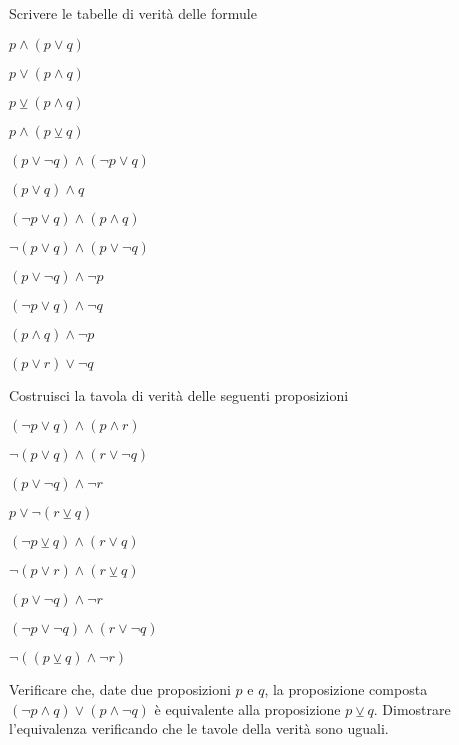 \begin{esercizio}
\label{ese:0.8}
Scrivere le tabelle di verità delle formule 
\begin{multicols}{3}
\begin{enumeratea}
\item $p\wedge(p\vee q)$
\item $p\vee(p\wedge q)$
\item $p\veebar(p\wedge q)$
\item $p\wedge(p\veebar q)$
\item $(p\vee \neg q)\wedge (\neg p\vee q)$
\item $(p\vee q)\wedge q$
\item $(\neg p\vee q)\wedge (p\wedge q)$
\item $\neg(p\vee q)\wedge (p\vee \neg q)$
\item $(p\vee \neg q)\wedge \neg p$
\item $(\neg p\vee q)\wedge \neg q$
\item $(p\wedge q)\wedge \neg p$
\item $(p\vee r)\vee \neg q$
\end{enumeratea}
\end{multicols}
\end{esercizio}

\begin{esercizio}
\label{ese:0.9}
Costruisci la tavola di verità delle seguenti proposizioni
\begin{multicols}{3}
\begin{enumeratea}
\item $(\neg p\vee q)\wedge(p\wedge r)$
\item $\neg(p\vee q)\wedge(r\vee \neg q)$
\item $(p\vee\neg q)\wedge \neg r$
\item $p\vee\neg(r\veebar q)$
\item $(\neg p\veebar q)\wedge(r\vee q)$
\item $\neg(p\vee r)\wedge(r\veebar q)$
\item $(p\vee\neg q)\wedge\neg r$
\item $(\neg p\vee\neg q)\wedge(r\vee\neg q)$
\item $\neg((p\veebar q)\wedge \neg r)$
\end{enumeratea}
\end{multicols}
\end{esercizio}

\begin{esercizio}
\label{ese:0.10}
Verificare che, date due proposizioni $p$ e $q$, la proposizione composta $(\neg p\wedge q)\vee(p\wedge \neg q)$ è equivalente alla proposizione $p\veebar q$. Dimostrare l'equivalenza verificando che le tavole della verità sono uguali.
\end{esercizio}

